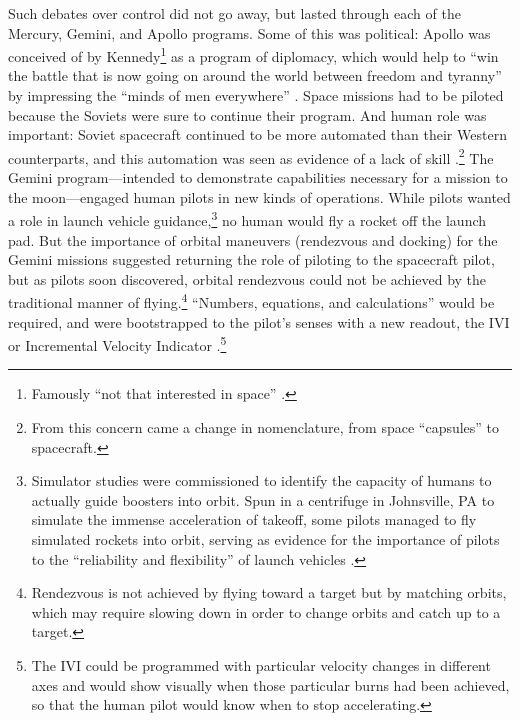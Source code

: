 Such debates over control did not go away, but lasted through each
of the Mercury, Gemini, and Apollo programs. Some of this was
political: Apollo was
conceived of by Kennedy\footnote{Famously ``not that interested in
space'' \cite{KennedyNov21}.} as a program of diplomacy,
which would help to ``win the battle that is now going on around the
world between freedom and tyranny'' by impressing the ``minds of men
everywhere'' \cite{KennedyMay25}. Space missions had to be piloted
because the Soviets were sure to continue their program. And human
role was important: Soviet spacecraft continued to be
more automated than their Western counterparts, and
this automation was seen as evidence of a lack of skill \cite[p.
  90]{DM}.\footnote{From this concern came a change in nomenclature,
  from space ``capsules'' to spacecraft\cite[p. 85]{kauffman}.}
The Gemini program---intended to demonstrate capabilities necessary
for a mission to the moon---engaged human pilots in new kinds of
operations. While pilots wanted a role in launch vehicle
guidance,\footnote{Simulator studies were commissioned to identify the
  capacity of humans to 
actually guide boosters into orbit. Spun in a
centrifuge in Johnsville, PA to simulate the immense acceleration of
takeoff, some pilots managed to fly
simulated rockets into orbit, serving as evidence for the importance of
pilots to the ``reliability and flexibility'' of launch vehicles
\cite[p. 72]{DM}.} no 
human would fly a rocket off the launch pad. But the importance of orbital maneuvers
 (rendezvous and docking) for the Gemini missions suggested returning
the role of piloting to the spacecraft pilot, but as
pilots soon discovered, orbital
rendezvous could not be achieved by the
traditional manner of flying.\footnote{Rendezvous is not achieved
by flying toward a target but by matching orbits, which may require
slowing down in order to change orbits and catch up to a target.}
``Numbers, equations, and calculations'' would be  
required, and were bootstrapped to the pilot's senses with a new
readout, the IVI or Incremental Velocity Indicator \cite[p.
  86-87]{DM}.\footnote{The IVI could be
programmed with particular velocity changes in different axes and
would show visually when those particular burns had been achieved,
so that the human pilot would know when to stop accelerating.}



